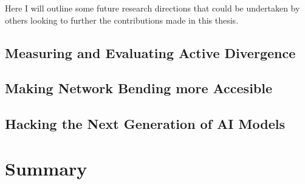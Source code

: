Here I will outline some future research directions that could be undertaken by others looking to further the contributions made in this thesis.

\subsection{Measuring and Evaluating Active Divergence}

\subsection{Making Network Bending more Accesible}

\subsection{Hacking the Next Generation of AI Models}

\section{Summary}

